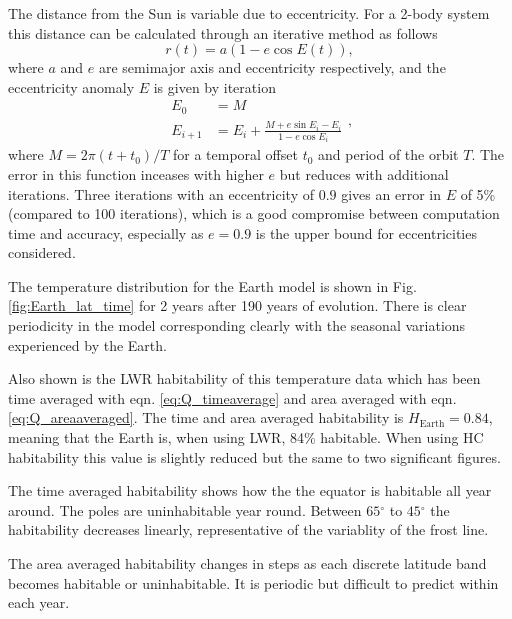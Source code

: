 \documentclass[12pt, onecolumn]{revtex4-2}    %
\newcommand{\degrees}{\ensuremath{^{\circ}}}
\begin{document}
The distance from the Sun is variable due to eccentricity.
For a 2-body system this distance can be calculated through an iterative method as follows
\begin{equation}
  r(t) = a (1 - e \cos E(t)), \label{eq:two_body_distance}
\end{equation}
where $a$ and $e$ are semimajor axis and eccentricity respectively, and the eccentricity anomaly $E$ is given by iteration
\begin{equation}
  \begin{split}
    E_0 &= M \\
    E_{i+1} &= E_i + \frac{M + e \sin E_i - E_i}{1-e \cos E_i}
  \end{split},
  \label{eq:two_body_angle}
\end{equation}
where $M = 2\pi (t + t_0) / T$ for a temporal offset $t_0$ and period of the orbit $T$.
The error in this function inceases with higher $e$ but reduces with additional iterations.
Three iterations with an eccentricity of $0.9$ gives an error in $E$ of 5\% (compared to 100 iterations), which is a good compromise between computation time and accuracy, especially as $e=0.9$ is the upper bound for eccentricities considered.

The temperature distribution for the Earth model is shown in Fig. \ref{fig:Earth_lat_time} for 2 years after 190 years of evolution.
There is clear periodicity in the model corresponding clearly with the seasonal variations experienced by the Earth.

Also shown is the LWR habitability of this temperature data which has been time averaged with eqn. \eqref{eq:Q_timeaverage} and area averaged with eqn. \eqref{eq:Q_areaaveraged}.
The time and area averaged habitability is $H_\text{Earth} = 0.84$, meaning that the Earth is, when using LWR, 84\% habitable.
When using HC habitability this value is slightly reduced but the same to two significant figures.

The time averaged habitability shows how the the equator is habitable all year around.
The poles are uninhabitable year round.
Between $65\degrees$ to $45\degrees$ the habitability decreases linearly, representative of the variablity of the frost line.

The area averaged habitability changes in steps as each discrete latitude band becomes habitable or uninhabitable.
It is periodic but difficult to predict within each year.
\end{document}

